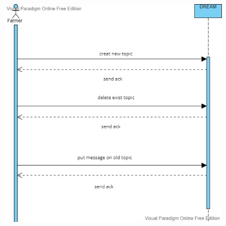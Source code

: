 \begin{figure}[H]
\includegraphics[width=1\textwidth]{figures/fifthSequenceDiagram.jpg}
\end{figure}
\clearpage

